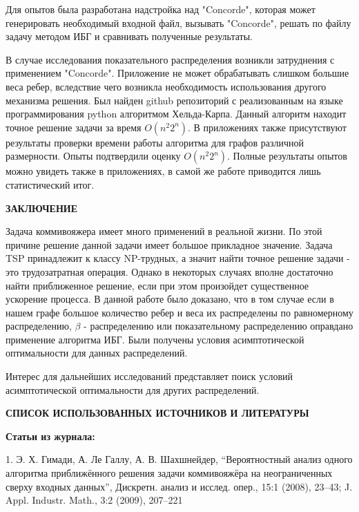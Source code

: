 \documentclass[a4paper, 14pt]{extarticle}
\begin{document}
Для опытов была разработана надстройка над "Concorde", которая может генерировать необходимый входной файл, вызывать "Concorde", решать по файлу задачу методом ИБГ и сравнивать полученные результаты.

В случае исследования показательного распределения возникли затруднения с применением "Concorde". Приложение не может обрабатывать слишком большие веса ребер, вследствие чего возникла необходимость использования другого механизма решения. Был найден github репозиторий с реализованным на языке программирования python алгоритмом Хельда-Карпа. Данный алгоритм находит точное решение задачи за время $O(n^2 2^n)$. В приложениях также присутствуют результаты проверки времени работы алгоритма для графов различной размерности. Опыты подтвердили оценку $O(n^2 2^n)$. Полные результаты опытов можно увидеть также в приложениях, в самой же работе приводится лишь статистический итог.


\newpage

\begin{center}
 \textbf{ЗАКЛЮЧЕНИЕ}
\end{center}

Задача коммивояжера имеет много применений в реальной жизни. По этой причине решение данной задачи имеет большое прикладное значение. Задача TSP принадлежит к классу NP-трудных, а значит найти точное решение задачи - это трудозатратная операция. Однако в некоторых случаях вполне достаточно найти приближенное решение, если при этом произойдет существенное ускорение процесса. В данной работе было доказано, что в том случае если в нашем графе большое количество ребер и веса их распределены по равномерному распределению, $\beta$ - распределению или показательному распределению оправдано применение алгоритма ИБГ. Были получены условия асимптотической оптимальности для данных распределений.

Интерес для дальнейших исследований представляет поиск условий асимптотической оптимальности для других распределений.





\newpage

\begin{center}
 \textbf{СПИСОК ИСПОЛЬЗОВАННЫХ ИСТОЧНИКОВ И ЛИТЕРАТУРЫ }
\end{center}

\textbf{Статьи из журнала:}

1. 	Э. Х. Гимади, А. Ле Галлу, А. В. Шахшнейдер, “Вероятностный анализ одного алгоритма приближённого решения задачи коммивояжёра на неограниченных сверху входных данных”, Дискретн. анализ и исслед. опер., 15:1 (2008), 23–43; J. Appl. Industr. Math., 3:2 (2009), 207–221
\end{document}
